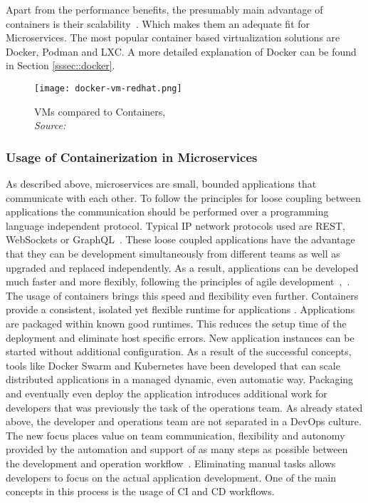 \documentclass[12pt, a4paper]{article}
\begin{document}
        Apart from the performance benefits, the presumably main advantage of containers is their scalability~\cite{cintainer_scale}. Which makes them an adequate fit for Microservices. The most popular container based virtualization solutions are Docker, Podman and LXC. A more detailed explanation of Docker can be found in Section \ref{sssec::docker}.

        \begin{figure}
            \centering
            \texttt{[image: docker-vm-redhat.png]}
            \caption{\ac{VM}s compared to Containers, \\\textit{Source:~\cite{redhat_pic}}}\label{fig::vm_docker}
        \end{figure}

        \subsubsection{Usage of Containerization in Microservices}
        As described above, microservices are small, bounded applications that communicate with each other. To follow the principles for loose coupling between applications the communication should be performed over a programming language independent protocol. Typical \acs{IP} network protocols used are \ac{REST}, WebSockets or GraphQL~\cite{micro}. These loose coupled applications have the advantage that they can be development simultaneously from different teams as well as upgraded and replaced independently. As a result, applications can be developed much faster and more flexibly, following the principles of agile development~\cite{micro},~\cite{redhat_micro}.\newline
        The usage of containers brings this speed and flexibility even further. Containers provide a consistent, isolated yet flexible runtime for applications \cite{micro_container}. Applications are packaged within known good runtimes. This reduces the setup time of the deployment and eliminate host specific errors. New application instances can be started without additional configuration. As a result of the successful concepts, tools like Docker Swarm and Kubernetes have been developed that can scale distributed applications in a managed dynamic, even automatic way.\newline
        \noindent Packaging and eventually even deploy the application introduces additional work for developers that was previously the task of the operations team. As already stated above, the developer and operations team are not separated in a DevOps culture. The new focus places value on team communication, flexibility and autonomy provided by the automation and support of as many steps as possible between the development and operation workflow~\cite{effective_devops}. Eliminating manual tasks allows developers to focus on the actual application development. One of the main concepts in this process is the usage of \ac{CI} and \ac{CD} workflows.
\end{document}
